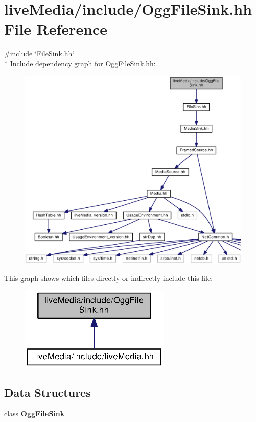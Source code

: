 \section{live\+Media/include/\+Ogg\+File\+Sink.hh File Reference}
\label{OggFileSink_8hh}
{\ttfamily \#include \char`\"{}File\+Sink.\+hh\char`\"{}}\\*
Include dependency graph for Ogg\+File\+Sink.\+hh\+:
\nopagebreak
\begin{figure}[H]
\begin{center}
\leavevmode
\includegraphics[width=350pt]{OggFileSink_8hh__incl}
\end{center}
\end{figure}
This graph shows which files directly or indirectly include this file\+:
\nopagebreak
\begin{figure}[H]
\begin{center}
\leavevmode
\includegraphics[width=204pt]{OggFileSink_8hh__dep__incl}
\end{center}
\end{figure}
\subsection*{Data Structures}
\begin{DoxyCompactItemize}
\item 
class {\bf Ogg\+File\+Sink}
\end{DoxyCompactItemize}
